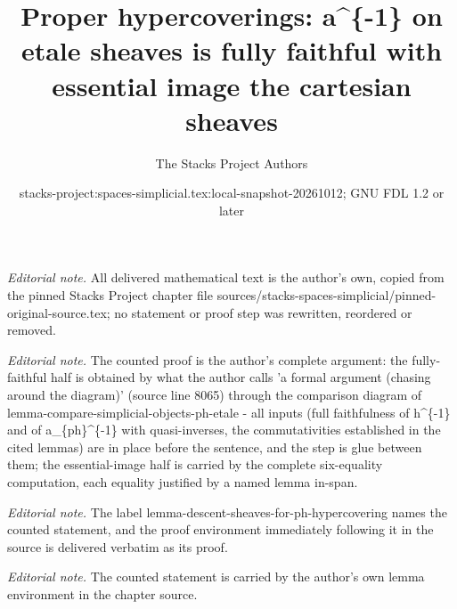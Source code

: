 \documentclass{stacks-project}
\title{Proper hypercoverings: a\textasciicircum{}\{-1\} on etale sheaves is fully faithful with essential image the cartesian sheaves}
\author{The Stacks Project Authors}
\date{stacks-project:spaces-simplicial.tex:local-snapshot-20261012; GNU FDL 1.2 or later}
\theoremstyle{plain}
\theoremstyle{definition}
\theoremstyle{remark}
\numberwithin{equation}{subsection}
\begin{document}
\maketitle
\noindent\textit{Editorial note.} All delivered mathematical text is the author's own, copied from the pinned Stacks Project chapter file sources/stacks-spaces-simplicial/pinned-original-source.tex; no statement or proof step was rewritten, reordered or removed.\par\medskip
\noindent\textit{Editorial note.} The counted proof is the author's complete argument: the fully-faithful half is obtained by what the author calls 'a formal argument (chasing around the diagram)' (source line 8065) through the comparison diagram of lemma-compare-simplicial-objects-ph-etale - all inputs (full faithfulness of h\textasciicircum{}\{-1\} and of a\_\{ph\}\textasciicircum{}\{-1\} with quasi-inverses, the commutativities established in the cited lemmas) are in place before the sentence, and the step is glue between them; the essential-image half is carried by the complete six-equality computation, each equality justified by a named lemma in-span.\par\medskip
\noindent\textit{Editorial note.} The label lemma-descent-sheaves-for-ph-hypercovering names the counted statement, and the proof environment immediately following it in the source is delivered verbatim as its proof.\par\medskip
\noindent\textit{Editorial note.} The counted statement is carried by the author's own lemma environment in the chapter source.\par\medskip
\end{document}
